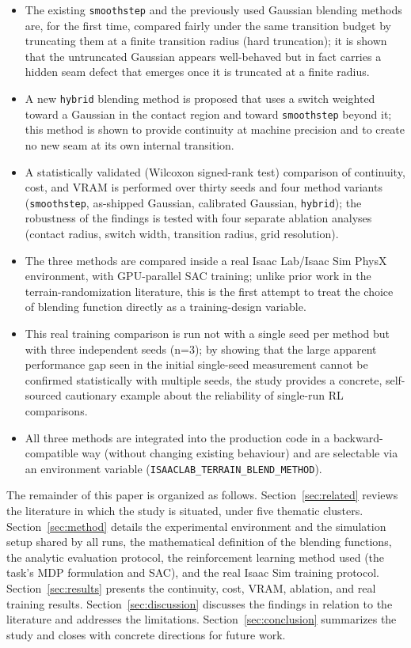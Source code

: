 \begin{itemize}
  \item The existing \texttt{smoothstep} and the previously used Gaussian blending methods are, for the first time, compared fairly under the same transition budget by truncating them at a finite transition radius (hard truncation); it is shown that the untruncated Gaussian appears well-behaved but in fact carries a hidden seam defect that emerges once it is truncated at a finite radius.
  \item A new \texttt{hybrid} blending method is proposed that uses a switch weighted toward a Gaussian in the contact region and toward \texttt{smoothstep} beyond it; this method is shown to provide continuity at machine precision and to create no new seam at its own internal transition.
  \item A statistically validated (Wilcoxon signed-rank test) comparison of continuity, cost, and VRAM is performed over thirty seeds and four method variants (\texttt{smoothstep}, as-shipped Gaussian, calibrated Gaussian, \texttt{hybrid}); the robustness of the findings is tested with four separate ablation analyses (contact radius, switch width, transition radius, grid resolution).
  \item The three methods are compared inside a real Isaac Lab/Isaac Sim PhysX environment, with GPU-parallel SAC training; unlike prior work in the terrain-randomization literature, this is the first attempt to treat the choice of blending function directly as a training-design variable.
  \item This real training comparison is run not with a single seed per method but with three independent seeds (n=3); by showing that the large apparent performance gap seen in the initial single-seed measurement cannot be confirmed statistically with multiple seeds, the study provides a concrete, self-sourced cautionary example about the reliability of single-run RL comparisons.
  \item All three methods are integrated into the production code in a backward-compatible way (without changing existing behaviour) and are selectable via an environment variable (\texttt{ISAACLAB\_TERRAIN\_BLEND\_METHOD}).
\end{itemize}

The remainder of this paper is organized as follows. Section~\ref{sec:related} reviews the literature in which the study is situated, under five thematic clusters. Section~\ref{sec:method} details the experimental environment and the simulation setup shared by all runs, the mathematical definition of the blending functions, the analytic evaluation protocol, the reinforcement learning method used (the task's MDP formulation and SAC), and the real Isaac Sim training protocol. Section~\ref{sec:results} presents the continuity, cost, VRAM, ablation, and real training results. Section~\ref{sec:discussion} discusses the findings in relation to the literature and addresses the limitations. Section~\ref{sec:conclusion} summarizes the study and closes with concrete directions for future work.
